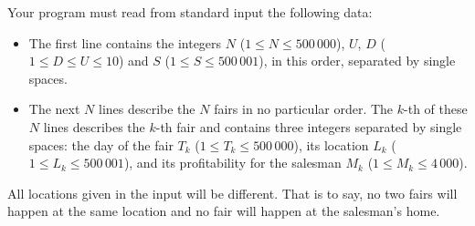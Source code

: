 Your program must read from standard input the following data:
\begin{itemize}
\item The first line contains the integers $N$ ($1 \le N \le 500\,000$), $U$, $D$ ($1 \le D \le U \le 10$) and $S$ ($1 \le S \le 500\,001$), in this order, separated by single spaces.
\item The next $N$ lines describe the $N$ fairs in no particular order. The $k$-th of these $N$ lines describes the $k$-th fair and contains three integers separated by single spaces: the day of the fair $T_k$ ($1 \le T_k \le 500\,000$), its location $L_k$ ($1 \le L_k \le 500\,001$), and its profitability for the salesman $M_k$ ($1 \le M_k \le 4\,000$).
\end{itemize}

All locations given in the input will be different. That is to say, no two fairs will happen at the same location and no fair will happen at the salesman's home.